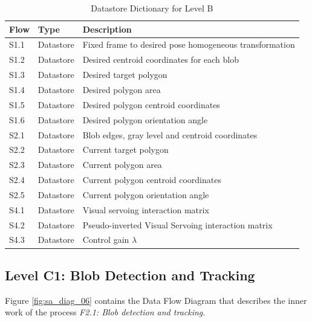 \begin{table}[!h]
	\centering
	\begin{tabular}{lll}
		\toprule
		Flow & Type & Description \\
		\midrule
		S1.1 & Datastore & Fixed frame to desired pose homogeneous transformation \\
		S1.2 & Datastore & Desired centroid coordinates for each blob \\
		S1.3 & Datastore & Desired target polygon \\
		S1.4 & Datastore & Desired polygon area \\
		S1.5 & Datastore & Desired polygon centroid coordinates \\
		S1.6 & Datastore & Desired polygon orientation angle \\
		S2.1 & Datastore & Blob edges, gray level and centroid coordinates \\
		S2.2 & Datastore & Current target polygon  \\
		S2.3 & Datastore & Current polygon area \\
		S2.4 & Datastore & Current polygon centroid coordinates \\
		S2.5 & Datastore & Current polygon orientation angle \\	
		S4.1 & Datastore & Visual servoing interaction matrix \\	
		S4.2 & Datastore & Pseudo-inverted Visual Servoing interaction matrix \\
		S4.3 & Datastore & Control gain $\lambda$ \\
		\bottomrule
	\end{tabular}
	\caption{Datastore Dictionary for Level B}
	\label{tab:DD-LB-b}
\end{table}

\pagebreak

\subsection{Level C1: Blob Detection and Tracking}
\label{sec:level-C1}

Figure \ref{fig:sa_diag_06} contains the Data Flow Diagram that describes the inner work of the process \textit{F2.1: Blob detection and tracking}.

